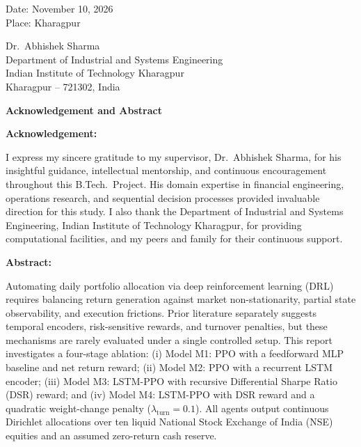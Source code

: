 \documentclass[11pt,a4paper]{article}
\numberwithin{equation}{section}
\numberwithin{table}{section}
\numberwithin{figure}{section}
\numberwithin{algorithm}{section}
\begin{document}
\noindent\begin{minipage}[t]{0.4\textwidth}
Date: November 10, 2026\\
Place: Kharagpur
\end{minipage}\hfill
\begin{minipage}[t]{0.55\textwidth}\raggedleft
Dr.\ Abhishek Sharma\\
Department of Industrial and Systems Engineering\\
Indian Institute of Technology Kharagpur\\
Kharagpur -- 721302, India
\end{minipage}
\clearpage

{\large\bfseries Acknowledgement and Abstract}\par\vspace{4pt}
\textbf{Acknowledgement:}\par
I express my sincere gratitude to my supervisor, Dr.\ Abhishek Sharma, for his insightful guidance, intellectual mentorship, and continuous encouragement throughout this B.Tech.\ Project. His domain expertise in financial engineering, operations research, and sequential decision processes provided invaluable direction for this study. I also thank the Department of Industrial and Systems Engineering, Indian Institute of Technology Kharagpur, for providing computational facilities, and my peers and family for their continuous support.

\textbf{Abstract:}\par
Automating daily portfolio allocation via deep reinforcement learning (DRL) requires balancing return generation against market non-stationarity, partial state observability, and execution frictions. Prior literature separately suggests temporal encoders, risk-sensitive rewards, and turnover penalties, but these mechanisms are rarely evaluated under a single controlled setup. This report investigates a four-stage ablation: (i) Model M1: PPO with a feedforward MLP baseline and net return reward; (ii) Model M2: PPO with a recurrent LSTM encoder; (iii) Model M3: LSTM-PPO with recursive Differential Sharpe Ratio (DSR) reward; and (iv) Model M4: LSTM-PPO with DSR reward and a quadratic weight-change penalty ($\lambda_{\mathrm{turn}}=0.1$). All agents output continuous Dirichlet allocations over ten liquid National Stock Exchange of India (NSE) equities and an assumed zero-return cash reserve.
\end{document}
